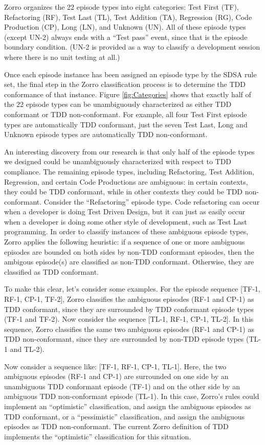 \documentclass[smallextended]{svjour3}     %
\begin{document}
Zorro organizes the 22 episode types into eight categories: Test First
(TF), Refactoring (RF), Test Last (TL), Test Addition (TA), Regression
(RG), Code Production (CP), Long (LN), and Unknown (UN).  All of these
episode types (except UN-2) always ends with a ``Test pass'' event, since that
is the episode boundary condition.  (UN-2 is provided as a way to classify
a development session where there is no unit testing at all.)

Once each episode instance has been assigned an episode type by the SDSA
rule set, the final step in the Zorro classification process is to
determine the TDD conformance of that instance.  Figure
\ref{fig:Categories} shows that exactly half of the 22 episode types can be
unambiguously characterized as either TDD conformant or TDD non-conformant.
For example, all four Test First episode types are automatically TDD
conformant, just the seven Test Last, Long and Unknown episode
types are automatically TDD non-conformant.

An interesting discovery from our research is that only half of the episode
types we designed could be unambiguously characterized with respect to TDD
compliance.  The remaining episode types, including Refactoring, Test
Addition, Regression, and certain Code Productions are ambiguous: in
certain contexts, they could be TDD conformant, while in other contexts
they could be TDD non-conformant.  Consider the ``Refactoring'' episode
type.  Code refactoring can occur when a developer is doing Test Driven
Design, but it can just as easily occur when a developer is doing some
other style of development, such as Test Last programming.  In order to
classify instances of these ambiguous episode types, Zorro applies the
following heuristic: if a sequence of one or more ambiguous episodes are
bounded on both sides by non-TDD conformant episodes, then the ambigous
episode(s) are classified as non-TDD conformant. Otherwise, they are
classified as TDD conformant.

To make this clear, let's consider some examples.  For the episode sequence
[TF-1, RF-1, CP-1, TF-2], Zorro classifies the ambiguous episodes (RF-1 and
CP-1) as TDD conformant, since they are surrounded by TDD conformant
episode types (TF-1 and TF-2).  Now consider the sequence [TL-1, RF-1,
CP-1, TL-2].  In this sequence, Zorro classifies the same two ambiguous
episodes (RF-1 and CP-1) as TDD non-conformant, since they are surrounded
by non-TDD episode types (TL-1 and TL-2).

Now consider a sequence like: [TF-1, RF-1, CP-1, TL-1].  Here, the two
ambiguous episodes (RF-1 and CP-1) are surrounded on one side by an
unambiguous TDD conformant episode (TF-1) and on the other side by an
ambiguous TDD non-conformant episode (TL-1).  In this case, Zorro's rules
could implement an ``optimistic'' classification, and assign the ambiguous
episodes as TDD conformant, or a ``pessimistic'' classification, and assign
the ambiguous episodes as TDD non-conformant.  The current Zorro definition
of TDD implements the ``optimistic'' classification for this situation.
\end{document}
